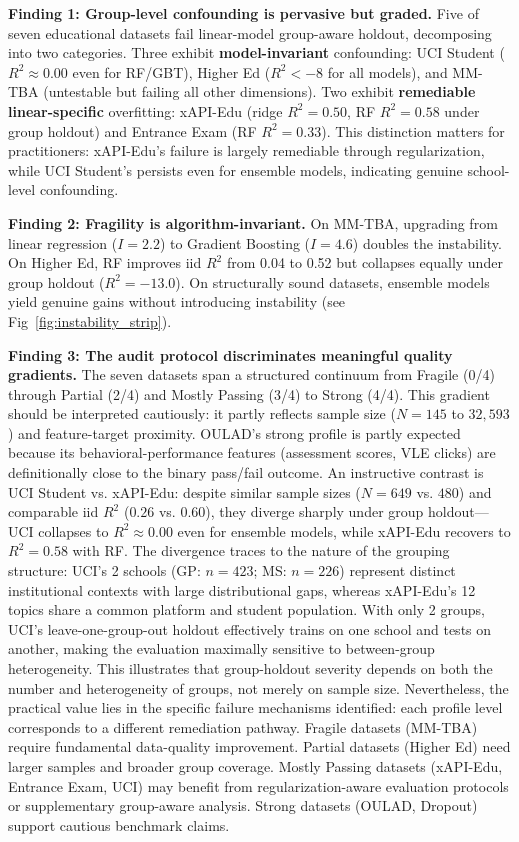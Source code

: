 \textbf{Finding 1: Group-level confounding is pervasive but graded.} Five of seven educational datasets fail linear-model group-aware holdout, decomposing into two categories. Three exhibit \textbf{model-invariant} confounding: UCI Student ($R^2 \approx 0.00$ even for RF/GBT), Higher Ed ($R^2 < -8$ for all models), and MM-TBA (untestable but failing all other dimensions). Two exhibit \textbf{remediable linear-specific} overfitting: xAPI-Edu (ridge $R^2 = 0.50$, RF $R^2 = 0.58$ under group holdout) and Entrance Exam (RF $R^2 = 0.33$). This distinction matters for practitioners: xAPI-Edu's failure is largely remediable through regularization, while UCI Student's persists even for ensemble models, indicating genuine school-level confounding.

\textbf{Finding 2: Fragility is algorithm-invariant.} On MM-TBA, upgrading from linear regression ($I = 2.2$) to Gradient Boosting ($I = 4.6$) doubles the instability. On Higher Ed, RF improves iid $R^2$ from 0.04 to 0.52 but collapses equally under group holdout ($R^2 = -13.0$). On structurally sound datasets, ensemble models yield genuine gains without introducing instability (see Fig~\ref{fig:instability_strip}).

\textbf{Finding 3: The audit protocol discriminates meaningful quality gradients.} The seven datasets span a structured continuum from Fragile (0/4) through Partial (2/4) and Mostly Passing (3/4) to Strong (4/4). This gradient should be interpreted cautiously: it partly reflects sample size ($N = 145$ to $32{,}593$) and feature-target proximity. OULAD's strong profile is partly expected because its behavioral-performance features (assessment scores, VLE clicks) are definitionally close to the binary pass/fail outcome. An instructive contrast is UCI Student vs. xAPI-Edu: despite similar sample sizes ($N = 649$ vs. $480$) and comparable iid $R^2$ ($0.26$ vs. $0.60$), they diverge sharply under group holdout---UCI collapses to $R^2 \approx 0.00$ even for ensemble models, while xAPI-Edu recovers to $R^2 = 0.58$ with RF. The divergence traces to the nature of the grouping structure: UCI's 2 schools (GP: $n=423$; MS: $n=226$) represent distinct institutional contexts with large distributional gaps, whereas xAPI-Edu's 12 topics share a common platform and student population. With only 2 groups, UCI's leave-one-group-out holdout effectively trains on one school and tests on another, making the evaluation maximally sensitive to between-group heterogeneity. This illustrates that group-holdout severity depends on both the number and heterogeneity of groups, not merely on sample size. Nevertheless, the practical value lies in the specific failure mechanisms identified: each profile level corresponds to a different remediation pathway. Fragile datasets (MM-TBA) require fundamental data-quality improvement. Partial datasets (Higher Ed) need larger samples and broader group coverage. Mostly Passing datasets (xAPI-Edu, Entrance Exam, UCI) may benefit from regularization-aware evaluation protocols or supplementary group-aware analysis. Strong datasets (OULAD, Dropout) support cautious benchmark claims.

